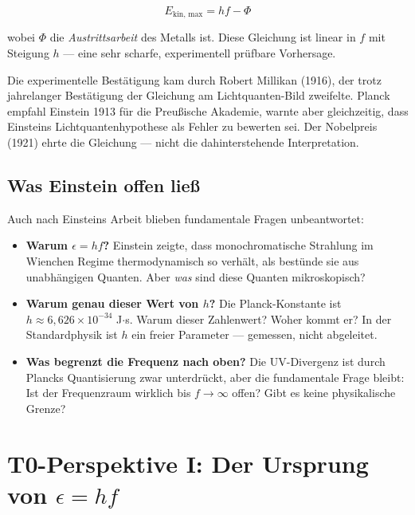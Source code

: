 \begin{equation}
    E_{\text{kin, max}} = hf - \Phi
    \label{eq:photoelectric}
\end{equation}

wobei $\Phi$ die \emph{Austrittsarbeit} des Metalls ist. Diese Gleichung ist linear 
in $f$ mit Steigung $h$ — eine sehr scharfe, experimentell prüfbare Vorhersage.

Die experimentelle Bestätigung kam durch Robert Millikan (1916), der trotz jahrelanger 
Bestätigung der Gleichung am Lichtquanten-Bild zweifelte. Planck empfahl Einstein 
1913 für die Preußische Akademie, warnte aber gleichzeitig, dass Einsteins 
Lichtquantenhypothese als Fehler zu bewerten sei. Der Nobelpreis (1921) ehrte 
die Gleichung — nicht die dahinterstehende Interpretation.

\subsection{Was Einstein offen ließ}

Auch nach Einsteins Arbeit blieben fundamentale Fragen unbeantwortet:

\begin{itemize}
    \item \textbf{Warum $\epsilon = hf$?} Einstein zeigte, dass monochromatische 
    Strahlung im Wienchen Regime thermodynamisch so verhält, als bestünde sie aus 
    unabhängigen Quanten. Aber \emph{was} sind diese Quanten mikroskopisch?
    
    \item \textbf{Warum genau dieser Wert von $h$?} Die Planck-Konstante ist 
    $h \approx 6{,}626 \times 10^{-34}$ J$\cdot$s. Warum dieser Zahlenwert? 
    Woher kommt er? In der Standardphysik ist $h$ ein freier Parameter — gemessen, 
    nicht abgeleitet.
    
    \item \textbf{Was begrenzt die Frequenz nach oben?} Die UV-Divergenz ist durch 
    Plancks Quantisierung zwar unterdrückt, aber die fundamentale Frage bleibt: 
    Ist der Frequenzraum wirklich bis $f \to \infty$ offen? Gibt es keine physikalische 
    Grenze?
\end{itemize}

\clearpage

\section{T0-Perspektive I: Der Ursprung von $\epsilon = hf$}
\label{sec:t0_quantization}

